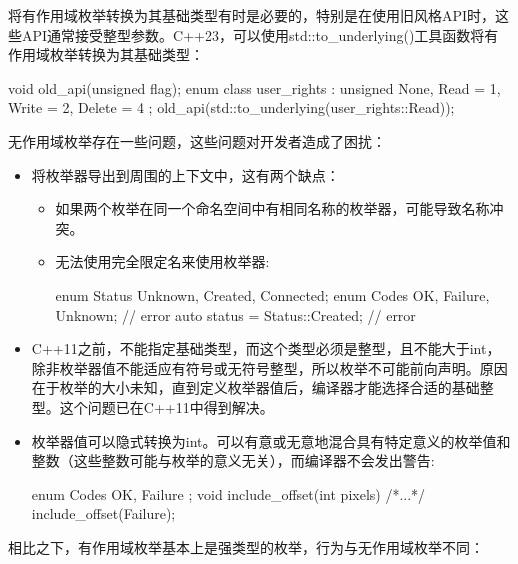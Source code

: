 将有作用域枚举转换为其基础类型有时是必要的，特别是在使用旧风格API时，这些API通常接受整型参数。C++23，可以使用std::to\_underlying()工具函数将有作用域枚举转换为其基础类型：

\begin{cpp}
void old_api(unsigned flag);
enum class user_rights : unsigned
{
    None, Read = 1, Write = 2, Delete = 4
};
old_api(std::to_underlying(user_rights::Read));
\end{cpp}


无作用域枚举存在一些问题，这些问题对开发者造成了困扰：

\begin{itemize}
\item
将枚举器导出到周围的上下文中，这有两个缺点：

\begin{itemize}
\item
如果两个枚举在同一个命名空间中有相同名称的枚举器，可能导致名称冲突。

\item
无法使用完全限定名来使用枚举器:

\begin{cpp}
enum Status {Unknown, Created, Connected};
enum Codes {OK, Failure, Unknown};   // error
auto status = Status::Created;       // error
\end{cpp}
\end{itemize}

\item
C++11之前，不能指定基础类型，而这个类型必须是整型，且不能大于int，除非枚举器值不能适应有符号或无符号整型，所以枚举不可能前向声明。原因在于枚举的大小未知，直到定义枚举器值后，编译器才能选择合适的基础整型。这个问题已在C++11中得到解决。

\item
枚举器值可以隐式转换为int。可以有意或无意地混合具有特定意义的枚举值和整数（这些整数可能与枚举的意义无关），而编译器不会发出警告:

\begin{cpp}
enum Codes { OK, Failure };
void include_offset(int pixels) {/*...*/}
include_offset(Failure);
\end{cpp}
\end{itemize}

相比之下，有作用域枚举基本上是强类型的枚举，行为与无作用域枚举不同：

